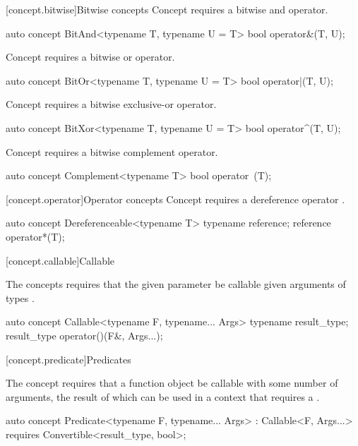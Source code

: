 \documentclass[american,twoside]{book}
\begin{document}
[concept.bitwise]{Bitwise concepts}
\pnum
Concept  requires a bitwise and operator.
\begin{itemdecl}
auto concept BitAnd<typename T, typename U = T> {
  bool operator&(T, U);
}
\end{itemdecl}

\pnum
Concept  requires a bitwise or operator.
\begin{itemdecl}
auto concept BitOr<typename T, typename U = T> {
  bool operator|(T, U);
}
\end{itemdecl}

\pnum
Concept  requires a bitwise exclusive-or operator.
\begin{itemdecl}
auto concept BitXor<typename T, typename U = T> {
  bool operator^(T, U);
}
\end{itemdecl}

\pnum
Concept  requires a bitwise complement  operator.
\begin{itemdecl}
auto concept Complement<typename T> {
  bool operator~(T);
}
\end{itemdecl}

[concept.operator]{Operator concepts}
\pnum
Concept  requires a
dereference operator \tcode{*}.
\begin{itemdecl}
auto concept Dereferenceable<typename T> {
  typename reference;
  reference operator*(T);
}
\end{itemdecl}

[concept.callable]{Callable}

\pnum 
The  concepts requires that the given
parameter  be callable given arguments of types .
\begin{itemdecl}
auto concept Callable<typename F, typename... Args> {
  typename result_type;
  result_type operator()(F&, Args...);
}
\end{itemdecl}


[concept.predicate]{Predicates}

\pnum
The  concept requires that a function object be
callable with some number of arguments, the result of which can be used in a
context that requires a .

\begin{itemdecl}
auto concept Predicate<typename F, typename... Args> : Callable<F, Args...> {
  requires Convertible<result_type, bool>;
}
\end{itemdecl}
\end{document}
